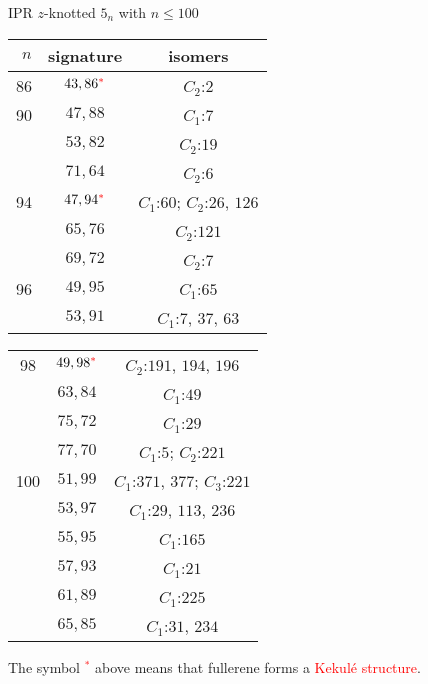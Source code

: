\documentclass[%
pdf,
colorBG,
slideColor,
]{prosper}
\begin{document}
\begin{slide}{IPR $z$-knotted $5_n$ with $n\leq 100$}
\begin{center}
\begin{minipage}{5.5cm}
{\tiny
\begin{tabular}{|c||c|c|}
\hline
$\,\,n$  &signature &isomers\\
\hline
86       &$43,86^{\textcolor{red}{*}}$&$C_2$:$2$\\
90       &$47,88$&$C_1$:$7$\\
         &$53,82$&$C_2$:$19$\\
         &$71,64$&$C_2$:$6$\\
94       &$47,94^{\textcolor{red}{*}}$&$C_1$:$60$; $C_2$:$26$, $126$\\
         &$65,76$&$C_2$:$121$\\
         &$69,72$&$C_2$:$7$\\
96       &$49,95$&$C_1$:$65$\\
         &$53,91$&$C_1$:$7$, $37$, $63$\\
\hline
\end{tabular}
}
\end{minipage}
\begin{minipage}{5.5cm}
{\tiny
\begin{tabular}{|c||c|c|}
\hline
98       &$49,98^{\textcolor{red}{*}}$&$C_2$:$191$, $194$, $196$\\
         &$63,84$&$C_1$:$49$\\
         &$75,72$&$C_1$:$29$\\
         &$77,70$&$C_1$:$5$; $C_2$:$221$\\
100      &$51,99$&$C_1$:$371$, $377$; $C_3$:$221$\\
         &$53,97$&$C_1$:$29$, $113$, $236$\\
         &$55,95$&$C_1$:$165$\\
         &$57,93$&$C_1$:$21$\\
         &$61,89$&$C_1$:$225$\\
         &$65,85$&$C_1$:$31$, $234$\\
\hline
\end{tabular}
}
\end{minipage}
\end{center}
The symbol \textcolor{red}{${}^*$} above means that fullerene forms a \textcolor{red}{Kekul\'e structure}.


\end{slide}
\end{document}
